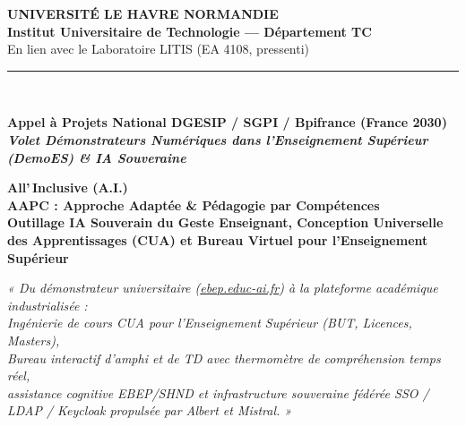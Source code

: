 \documentclass[11pt,a4paper]{article}
\begin{document}

\begin{titlepage}
    \centering
    \vspace*{-1cm}
    
    {\Large\bfseries\color{univBlue} UNIVERSITÉ LE HAVRE NORMANDIE}\\[0.2cm]
    {\normalsize\bfseries Institut Universitaire de Technologie --- Département TC}\\[0.1cm]
    {\small En lien avec le Laboratoire LITIS (EA 4108, pressenti)}\\[0.4cm]
    \rule{\textwidth}{1.2pt}\\[0.5cm]

    \begin{tcolorbox}[colback=accentBlue!8, colframe=accentBlue!80, arc=4mm, boxrule=1pt, width=0.92\textwidth]
        \centering\small\bfseries\color{univBlue}
        Appel à Projets National DGESIP / SGPI / Bpifrance (France 2030)\\[0.1cm]
        \textit{Volet Démonstrateurs Numériques dans l'Enseignement Supérieur (DemoES) \& IA Souveraine}
    \end{tcolorbox}

    \vspace{0.7cm}

    {\Huge\bfseries\textcolor{primaryRed}{A}ll'\,\textcolor{primaryRed}{I}nclusive \color{darkText}(A.I.)}\\[0.3cm]
    {\Large\bfseries\color{univBlue} AAPC : Approche Adaptée \& Pédagogie par Compétences}\\[0.3cm]
    {\large\bfseries\color{darkText} Outillage IA Souverain du Geste Enseignant, Conception Universelle\\des Apprentissages (CUA) et Bureau Virtuel pour l'Enseignement Supérieur}\\[0.4cm]
    
    \begin{tcolorbox}[colback=bgGray, colframe=softPurple, arc=3mm, boxrule=0.8pt, width=0.96\textwidth]
        \centering\itshape\small\color{darkText}
        « Du démonstrateur universitaire (\href{https://ebep.educ-ai.fr/}{ebep.educ-ai.fr}) à la plateforme académique industrialisée :\\
        Ingénierie de cours CUA pour l'Enseignement Supérieur (BUT, Licences, Masters),\\
        Bureau interactif d'amphi et de TD avec thermomètre de compréhension temps réel,\\
        assistance cognitive EBEP/SHND et infrastructure souveraine fédérée SSO / LDAP / Keycloak propulsée par Albert et Mistral. »
    \end{tcolorbox}


\end{titlepage}
\end{document}

